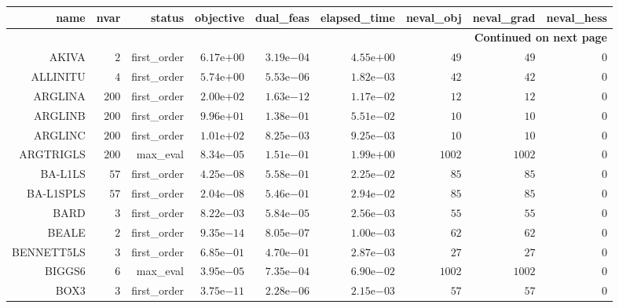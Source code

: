 \begin{longtable}{rrrrrrrrr}
\hline
name & nvar & status & objective & dual\_feas & elapsed\_time & neval\_obj & neval\_grad & neval\_hess \\\hline
\endhead
\hline
\multicolumn{9}{r}{{\bfseries Continued on next page}}\\
\hline
\endfoot
\endlastfoot
AKIVA & \(     2\) & first\_order & \( 6.17\)e\(+00\) & \( 3.19\)e\(-04\) & \( 4.55\)e\(+00\) & \(    49\) & \(    49\) & \(     0\) \\
ALLINITU & \(     4\) & first\_order & \( 5.74\)e\(+00\) & \( 5.53\)e\(-06\) & \( 1.82\)e\(-03\) & \(    42\) & \(    42\) & \(     0\) \\
ARGLINA & \(   200\) & first\_order & \( 2.00\)e\(+02\) & \( 1.63\)e\(-12\) & \( 1.17\)e\(-02\) & \(    12\) & \(    12\) & \(     0\) \\
ARGLINB & \(   200\) & first\_order & \( 9.96\)e\(+01\) & \( 1.38\)e\(-01\) & \( 5.51\)e\(-02\) & \(    10\) & \(    10\) & \(     0\) \\
ARGLINC & \(   200\) & first\_order & \( 1.01\)e\(+02\) & \( 8.25\)e\(-03\) & \( 9.25\)e\(-03\) & \(    10\) & \(    10\) & \(     0\) \\
ARGTRIGLS & \(   200\) & max\_eval & \( 8.34\)e\(-05\) & \( 1.51\)e\(-01\) & \( 1.99\)e\(+00\) & \(  1002\) & \(  1002\) & \(     0\) \\
BA-L1LS & \(    57\) & first\_order & \( 4.25\)e\(-08\) & \( 5.58\)e\(-01\) & \( 2.25\)e\(-02\) & \(    85\) & \(    85\) & \(     0\) \\
BA-L1SPLS & \(    57\) & first\_order & \( 2.04\)e\(-08\) & \( 5.46\)e\(-01\) & \( 2.94\)e\(-02\) & \(    85\) & \(    85\) & \(     0\) \\
BARD & \(     3\) & first\_order & \( 8.22\)e\(-03\) & \( 5.84\)e\(-05\) & \( 2.56\)e\(-03\) & \(    55\) & \(    55\) & \(     0\) \\
BEALE & \(     2\) & first\_order & \( 9.35\)e\(-14\) & \( 8.05\)e\(-07\) & \( 1.00\)e\(-03\) & \(    62\) & \(    62\) & \(     0\) \\
BENNETT5LS & \(     3\) & first\_order & \( 6.85\)e\(-01\) & \( 4.70\)e\(-01\) & \( 2.87\)e\(-03\) & \(    27\) & \(    27\) & \(     0\) \\
BIGGS6 & \(     6\) & max\_eval & \( 3.95\)e\(-05\) & \( 7.35\)e\(-04\) & \( 6.90\)e\(-02\) & \(  1002\) & \(  1002\) & \(     0\) \\
BOX3 & \(     3\) & first\_order & \( 3.75\)e\(-11\) & \( 2.28\)e\(-06\) & \( 2.15\)e\(-03\) & \(    57\) & \(    57\) & \(     0\) \\

\end{longtable}
